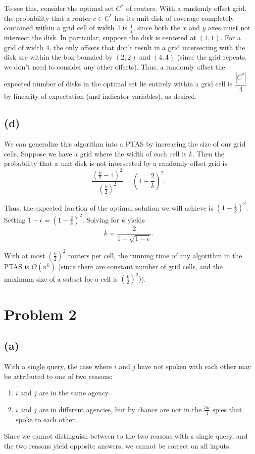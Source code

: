\documentclass{6046}
\begin{document}
To see this, consider the optimal set $C^*$
of routers. With a randomly offset grid,
the probability that a router $c \in C^*$
has its unit disk of coverage completely
contained within a grid cell of width $4$
is $\frac{1}{4}$, since both the $x$ and $y$
axes must not intersect the disk. In particular,
suppose the disk is centered at $(1, 1)$.
For a grid of width $4$, the only offsets
that don't result in a grid intersecting
with the disk are within the box bounded
by $(2, 2)$ and $(4, 4)$ (since the grid
repeats, we don't need to consider any
other offsets). Thus, a randomly offset
the expected number of disks in the
optimal set lie entirely within a grid cell
is $\dfrac{|C^*|}{4}$ by linearity of expectation
(and indicator variables), as desired.

\subsection*{(d)}
We can generalize this algorithm into a PTAS by
increasing the size of our grid cells. Suppose
we have a grid where the width of each cell is
$k$. Then the probability that a unit disk
is not intersected by a randomly offset grid
is
\[
    \frac{(\frac{k}{2} - 1)^2}{(\frac{k}{2})^2} = (1 - \frac{2}{k})^2.
\]

Thus, the expected fraction of the optimal
solution we will achieve is $(1 - \frac{2}{k})^2$.
Setting $1 - \epsilon = (1 - \frac{2}{k})^2$.
Solving for $k$ yields
\[
    k = \frac{2}{1 - \sqrt{1 - \epsilon}}.
\]

With at most $(\frac{k}{2})^2$ routers per cell,
the running time of any algorithm in the PTAS
is $O(n^k)$ (since there are constant number of
grid cells, and the maximum size of a subset
for a cell is $(\frac{k}{2})^2)$).



\section*{Problem 2}
\subsection*{(a)}
With a single query, the case where
$i$ and $j$ have not spoken with
each other may be attributed to one of two reasons:
\vspace{-1em}
\begin{enumerate}[noitemsep]
    \item $i$ and $j$ are in the same agency.
    \item $i$ and $j$ are in different agencies, but by chance
    are not in the $\frac{3n}{4}$ spies that spoke to each other.
\end{enumerate}
\vspace{-1em}
Since we cannot distinguish between to the two reasons
with a single query, and the two reasons yield
opposite answers, we cannot be correct on all inputs.
\end{document}
